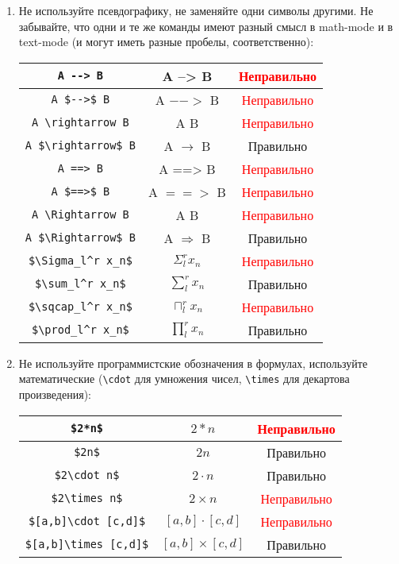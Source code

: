 \documentclass[12pt,a4paper]{book}
\newcommand{\ok}{& \textcolor{green!60!black}{Правильно}}
\newcommand{\bad}{& \textcolor{red}{Неправильно}}
\begin{document}
\begin{enumerate}
\item 
	Не используйте псевдографику, не заменяйте одни символы другими. 
	Не забывайте, что одни и те же команды имеют разный смысл в math-mode и в text-mode (и могут иметь разные пробелы, соответственно):
	\begin{center}\begin{tabular}{|c|c|c|}
		\hline \verb!A --> B! & A --> B \bad \\
		\hline \verb!A $-->$ B! & A $-->$ B \bad \\
		\hline \verb!A \rightarrow B! & A \rightarrow B \bad \\
		\hline \verb!A $\rightarrow$ B! & A $\rightarrow$ B \ok \\
		\hline \verb!A ==> B! & A ==> B \bad \\
		\hline \verb!A $==>$ B! & A $==>$ B \bad \\
		\hline \verb!A \Rightarrow B! & A \Rightarrow B \bad \\
		\hline \verb!A $\Rightarrow$ B! & A $\Rightarrow$ B \ok \\
		\hline \verb!$\Sigma_l^r x_n$! & $\Sigma_l^r x_n$ \bad \\
		\hline \verb!$\sum_l^r x_n$! & $\sum_l^r x_n$ \ok \\
		\hline \verb!$\sqcap_l^r x_n$! & $\sqcap_l^r x_n$ \bad \\
		\hline \verb!$\prod_l^r x_n$! & $\prod_l^r x_n$ \ok \\
		\hline
	\end{tabular}\end{center}

\item
	Не используйте программистские обозначения в формулах, используйте математические 
	(\verb!\cdot! для умножения чисел, \verb!\times! для декартова произведения):
	\begin{center}\begin{tabular}{|c|c|c|}
		\hline \verb!$2*n$! & $2*n$ \bad \\
		\hline \verb!$2n$! & $2n$ \ok \\
		\hline \verb!$2\cdot n$! & $2\cdot n$ \ok \\
		\hline \verb!$2\times n$! & $2\times n$ \bad \\
		\hline \verb!$[a,b]\cdot [c,d]$! & $[a,b]\cdot [c,d]$ \bad \\
		\hline \verb!$[a,b]\times [c,d]$! & $[a,b]\times [c,d]$ \ok \\
		\hline
	\end{tabular}\end{center}


\end{enumerate}
\end{document}
